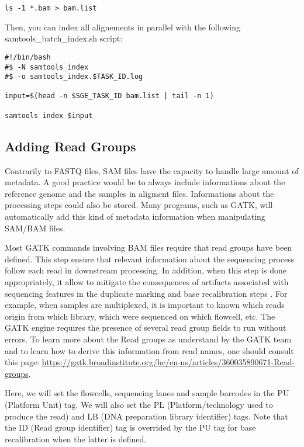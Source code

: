 \begin{verbatim}
ls -1 *.bam > bam.list
\end{verbatim}

Then, you can index all alignements in parallel with the following samtools\_batch\_index.sh script:

\begin{verbatim}
#!/bin/bash
#$ -N samtools_index
#$ -o samtools_index.$TASK_ID.log

input=$(head -n $SGE_TASK_ID bam.list | tail -n 1)

samtools index $input
\end{verbatim}





\subsection{Adding Read Groups}

Contrarily to FASTQ files, SAM files have the capacity to handle large amount of metadata. A good practice would be to always include informations about the reference genome and the samples in aligment files. Informations about the processing steps could also be stored. Many programs, such as GATK, will automatically add this kind of metadata information when manipulating SAM/BAM files.


Most GATK commands involving BAM files require that read groups have been defined. This step ensure that relevant information about the sequencing process follow each read in downstream processing. In addition, when this step is done appropriately, it allow to mitigate the consequences of artifacts associated with sequencing features in the duplicate marking and base recalibration steps \cite{GATK_ReadGroups}. For example, when samples are multiplexed, it is important to known which reads origin from which library, which were sequenced on which flowcell, etc. The GATK engine requires the presence of several read group fields to run without errors. To learn more about the Read groups as understand by the GATK team and to learn how to derive this information from read names, one should consult this page: \href{https://gatk.broadinstitute.org/hc/en-us/articles/360035890671-Read-groups}{https://gatk.broadinstitute.org/hc/en-us/articles/360035890671-Read-groups}.

Here, we will set the flowcells, sequencing lanes and sample barcodes in the PU (Platform Unit) tag. We will also set the PL (Platform/technology used to produce the read) and LB (DNA preparation library identifier) tags. Note that the ID (Read group identifier) tag is overrided by the PU tag for base recalibration when the latter is defined.

